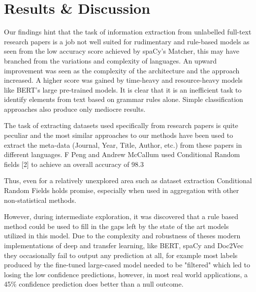 \documentclass[twocolumn]{article}
\begin{document}
\section{Results \& Discussion}
Our findings hint that the task of information extraction from unlabelled full-text research papers is a job not well suited for rudimentary and rule-based models as seen from the low accuracy score achieved by spaCy's Matcher, this may have branched from the variations and complexity of languages. An upward improvement was seen as the complexity of the architecture and the approach increased. A higher score was gained by time-heavy and resource-heavy models like BERT's large pre-trained models. It is clear that it is an inefficient task to identify elements from text based on grammar rules alone. Simple classification approaches also produce only mediocre results. 

The task of extracting datasets used specifically from research papers is quite peculiar and the most similar approaches to our methods have been used to extract the meta-data (Journal, Year, Title, Author, etc.) from these papers in different languages. F Peng and Andrew McCallum used Conditional Random fields [2] to achieve an overall accuracy of 98.3%

Thus, even for a relatively unexplored area such as dataset extraction Conditional Random Fields holds promise, especially when used in aggregation with other non-statistical methods.

However, during intermediate exploration, it was discovered that a rule based method could be used to fill in the gaps left by the state of the art models utilized in this model. Due to the complexity and robustness of theses modern implementations of deep and transfer learning, like BERT, spaCy and Doc2Vec they occasionally fail to output any prediction at all, for example most labels produced by the fine-tuned large-cased model needed to be "filtered" which led to losing the low confidence predictions, however, in most real world applications, a 45\% confidence prediction does better than a null outcome.
\end{document}
